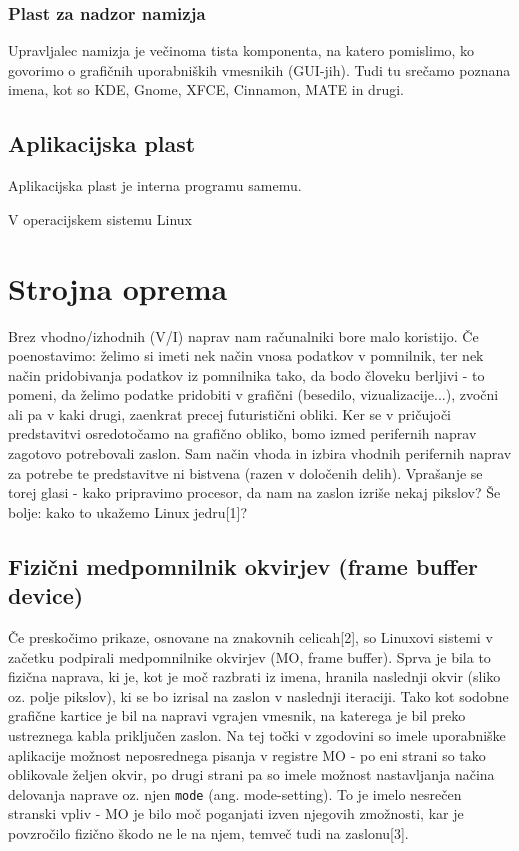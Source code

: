 \documentclass{article}
\begin{document}
\subsubsection{Plast za nadzor namizja}
Upravljalec namizja je večinoma tista komponenta, na katero pomislimo, ko govorimo o grafičnih uporabniških vmesnikih (GUI-jih). Tudi tu srečamo poznana imena, kot so KDE, Gnome, XFCE, Cinnamon, MATE in drugi.

\subsection{Aplikacijska plast}
Aplikacijska plast je interna programu samemu.

V operacijskem sistemu Linux

\section{Strojna oprema}
Brez vhodno/izhodnih (V/I) naprav nam računalniki bore malo koristijo. Če poenostavimo: želimo si imeti nek način vnosa podatkov v pomnilnik, ter nek način pridobivanja podatkov iz pomnilnika tako, da bodo človeku berljivi - to pomeni, da želimo podatke pridobiti v grafični (besedilo, vizualizacije...), zvočni ali pa v kaki drugi, zaenkrat precej futuristični obliki. Ker se v pričujoči predstavitvi osredotočamo na grafično obliko, bomo izmed perifernih naprav zagotovo potrebovali zaslon. Sam način vhoda in izbira vhodnih perifernih naprav za potrebe te predstavitve ni bistvena (razen v določenih delih).
Vprašanje se torej glasi - kako pripravimo procesor, da nam na zaslon izriše nekaj pikslov? Še bolje: kako to ukažemo Linux jedru[1]?

\subsection{Fizični medpomnilnik okvirjev (frame buffer device)}
Če preskočimo prikaze, osnovane na znakovnih celicah[2], so Linuxovi sistemi v začetku podpirali medpomnilnike okvirjev (MO, frame buffer). Sprva je bila to fizična naprava, ki je, kot je moč razbrati iz imena, hranila naslednji okvir (sliko oz. polje pikslov), ki se bo izrisal na zaslon v naslednji iteraciji. Tako kot sodobne grafične kartice je bil na napravi vgrajen vmesnik, na katerega je bil preko ustreznega kabla priključen zaslon. Na tej točki v zgodovini so imele uporabniške aplikacije možnost neposrednega pisanja v registre MO - po eni strani so tako oblikovale željen okvir, po drugi strani pa so imele možnost nastavljanja načina delovanja naprave oz. njen \lstinline{mode} (ang. mode-setting). To je imelo nesrečen stranski vpliv - MO je bilo moč poganjati izven njegovih zmožnosti, kar je povzročilo fizično škodo ne le na njem, temveč tudi na zaslonu[3].
\end{document}
